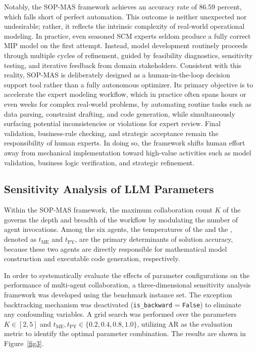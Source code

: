 \documentclass[preprint,12pt]{elsarticle}
\begin{document}
Notably, the SOP-MAS framework achieves an accuracy rate of 86.59 percent, which falls short of perfect automation. This outcome is neither unexpected nor undesirable; rather, it reflects the intrinsic complexity of real-world operational modeling. In practice, even seasoned SCM experts seldom produce a fully correct MIP model on the first attempt. Instead, model development routinely proceeds through multiple cycles of refinement, guided by feasibility diagnostics, sensitivity testing, and iterative feedback from domain stakeholders. Consistent with this reality, SOP-MAS is deliberately designed as a human-in-the-loop decision support tool rather than a fully autonomous optimizer. Its primary objective is to accelerate the expert modeling workflow, which in practice often spans hours or even weeks for complex real-world problems, by automating routine tasks such as data parsing, constraint drafting, and code generation, while simultaneously surfacing potential inconsistencies or violations for expert review. Final validation, business-rule checking, and strategic acceptance remain the responsibility of human experts. In doing so, the framework shifts human effort away from mechanical implementation toward high-value activities such as model validation, business logic verification, and strategic refinement.

\subsection{Sensitivity Analysis of LLM Parameters}

Within the SOP-MAS framework, the maximum collaboration count $K$ of the  governs the depth and breadth of the workflow by modulating the number of agent invocations. Among the six agents, the temperatures of the  and the , denoted as $t_\text{ME}$ and $t_\text{PY}$, are the primary determinants of solution accuracy, because these two agents are directly responsible for mathematical model construction and executable code generation, respectively.

In order to systematically evaluate the effects of parameter configurations on the performance of multi-agent collaboration, a three-dimensional sensitivity analysis framework was developed using the benchmark instance set. The exception backtracking mechanism was deactivated (\texttt{is\_backward} = \texttt{False}) to eliminate any confounding variables. A grid search was performed over the parameters $K \in [2, 5]$ and $t_\text{ME}, t_\text{PY} \in \{0.2, 0.4, 0.8, 1.0\}$, utilizing AR as the evaluation metric to identify the optimal parameter combination. The results are shown in Figure~\ref{fig3}.
\end{document}
